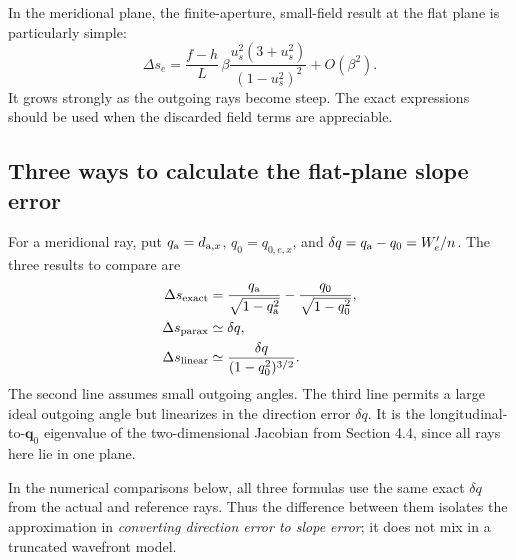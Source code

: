 \documentclass[11pt,a4paper]{article}
\numberwithin{equation}{section}
\newcommand{\vct}[1]{\bm{#1}}
\begin{document}
In the meridional plane, the finite-aperture, small-field result at the
flat plane is particularly simple:
\begin{equation}
 \Delta s_e
 =\frac{f-h}{L}\,
   \beta\frac{u_s^2(3+u_s^2)}{(1-u_s^2)^2}
   +O(\beta^2).
 \label{eq:mirror-meridional-limit}
\end{equation}
It grows strongly as the outgoing rays become steep.
The exact expressions should be used when the discarded field terms
are appreciable.

\subsection{Three ways to calculate the flat-plane slope error}
For a meridional ray, put $q_{\rm a}=d_{{\rm a},x}$,
$q_0=q_{0,e,x}$, and $\delta q=q_{\rm a}-q_0=W'_e/n$.
The three results to compare are
\begin{align}
 \Delta s_{\rm exact}
 &=\frac{q_{\rm a}}{\sqrt{1-q_{\rm a}^2}}
   -\frac{q_0}{\sqrt{1-q_0^2}},\label{eq:mirror-exact-numeric}\\
 \Delta s_{\rm parax}
 &\simeq\delta q,\label{eq:mirror-parax-numeric}\\
 \Delta s_{\rm linear}
 &\simeq\frac{\delta q}{(1-q_0^2)^{3/2}}.
 \label{eq:mirror-linear-numeric}
\end{align}
The second line assumes small outgoing angles.
The third line permits a large ideal outgoing angle but linearizes in
the direction error $\delta q$.
It is the longitudinal-to-$\vct q_0$ eigenvalue of the two-dimensional
Jacobian from Section 4.4, since all rays here lie in one plane.

In the numerical comparisons below, all three formulas use the same
exact $\delta q$ from the actual and reference rays.
Thus the difference between them isolates the approximation in
\emph{converting direction error to slope error}; it does not mix in a
truncated wavefront model.
\end{document}
